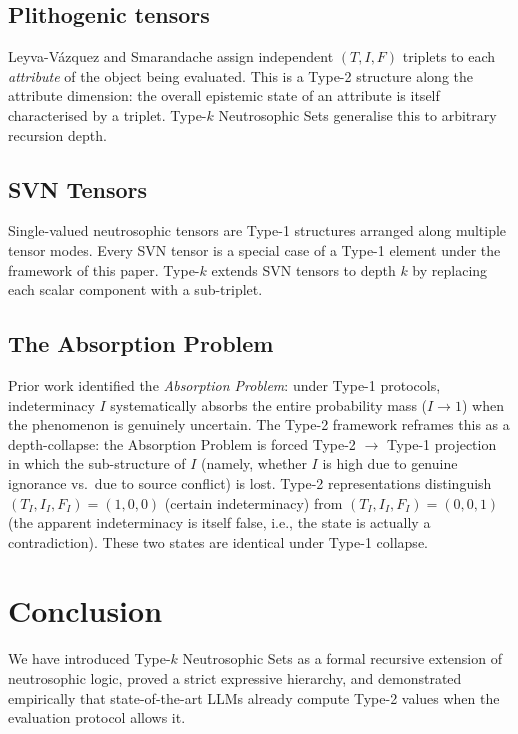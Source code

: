 \documentclass[10pt,a4paper]{article}
\begin{document}
\subsection{Plithogenic tensors}

Leyva-V\'{a}zquez and Smarandache \cite{leyvavazquez2026plithogenic}
assign independent $(T, I, F)$ triplets to each
\emph{attribute} of the object being evaluated.
This is a Type-2 structure along the attribute
dimension: the overall epistemic state of an attribute
is itself characterised by a triplet.
Type-$k$ Neutrosophic Sets generalise this to arbitrary
recursion depth.

\subsection{SVN Tensors}

Single-valued neutrosophic tensors
\cite{leyvavazquez2026svntensors} are Type-1 structures
arranged along multiple tensor modes.
Every SVN tensor is a special case of a Type-1 element
under the framework of this paper.
Type-$k$ extends SVN tensors to depth $k$ by replacing
each scalar component with a sub-triplet.

\subsection{The Absorption Problem}

Prior work \cite{leyvavazquez2026plithogenic} identified
the \emph{Absorption Problem}: under Type-1 protocols,
indeterminacy $I$ systematically absorbs the entire
probability mass ($I \to 1$) when the phenomenon is
genuinely uncertain.
The Type-2 framework reframes this as a depth-collapse:
the Absorption Problem is forced Type-2 $\to$ Type-1
projection in which the sub-structure of $I$
(namely, whether $I$ is high due to genuine ignorance
vs.\ due to source conflict) is lost.
Type-2 representations distinguish $(T_I, I_I, F_I)
= (1, 0, 0)$ (certain indeterminacy) from
$(T_I, I_I, F_I) = (0, 0, 1)$
(the apparent indeterminacy is itself false, i.e.,
the state is actually a contradiction).
These two states are identical under Type-1 collapse.

\section{Conclusion}

We have introduced Type-$k$ Neutrosophic Sets as a
formal recursive extension of neutrosophic logic,
proved a strict expressive hierarchy, and demonstrated
empirically that state-of-the-art LLMs already compute
Type-2 values when the evaluation protocol allows it.
\end{document}
